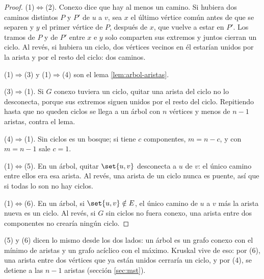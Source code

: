 \documentclass[11pt,letterpaper]{article}
\begin{document}
\begin{proof}
  (1)$\Leftrightarrow$(2). Conexo dice que hay al menos un camino. Si
  hubiera dos caminos distintos $P$ y $P'$ de $u$ a $v$, sea $x$ el
  último vértice común antes de que se separen y $y$ el primer vértice
  de $P$, después de $x$, que vuelve a estar en $P'$. Los tramos de
  $P$ y de $P'$ entre $x$ e $y$ solo comparten sus extremos y juntos
  cierran un ciclo. Al revés, si hubiera un ciclo, dos vértices
  vecinos en él estarían unidos por la arista y por el resto del
  ciclo: dos caminos.

  (1)$\Rightarrow$(3) y (1)$\Rightarrow$(4) son el lema
  \ref{lem:arbol-aristas}.

  (3)$\Rightarrow$(1). Si $G$ conexo tuviera un ciclo, quitar una
  arista del ciclo no lo desconecta, porque sus extremos siguen unidos
  por el resto del ciclo. Repitiendo hasta que no queden ciclos se
  llega a un árbol con $n$ vértices y menos de $n - 1$ aristas,
  contra el lema.

  (4)$\Rightarrow$(1). Sin ciclos es un bosque; si tiene $c$
  componentes, $m = n - c$, y con $m = n - 1$ sale $c = 1$.

  (1)$\Leftrightarrow$(5). En un árbol, quitar $\set{u, v}$ desconecta
  a $u$ de $v$: el único camino entre ellos era esa arista. Al revés,
  una arista de un ciclo nunca es puente, así que si todas lo son no
  hay ciclos.

  (1)$\Leftrightarrow$(6). En un árbol, si $\set{u, v} \notin E$, el
  único camino de $u$ a $v$ más la arista nueva es un ciclo. Al
  revés, si $G$ sin ciclos no fuera conexo, una arista entre dos
  componentes no crearía ningún ciclo.
\end{proof}

\begin{idea}
  (5) y (6) dicen lo mismo desde los dos lados: un árbol es un grafo
  conexo con el mínimo de aristas y un grafo acíclico con el máximo.
  Kruskal vive de eso: por (6), una arista entre dos vértices que ya
  están unidos cerraría un ciclo, y por (4), se detiene a las $n - 1$
  aristas (sección \ref{sec:mst}).
\end{idea}
\end{document}
